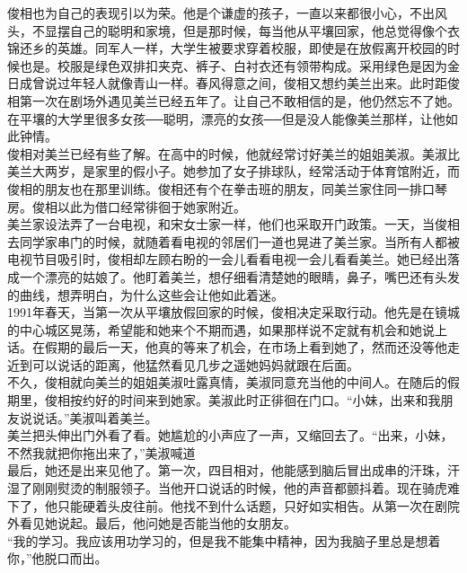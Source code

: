 俊相也为自己的表现引以为荣。他是个谦虚的孩子，一直以来都很小心，不出风头，不显摆自己的聪明和家境，但是那时候，每当他从平壤回家，他总觉得像个衣锦还乡的英雄。同军人一样，大学生被要求穿着校服，即使是在放假离开校园的时候也是。校服是绿色双排扣夹克、裤子、白衬衣还有领带构成。采用绿色是因为金日成曾说过年轻人就像青山一样。春风得意之间，俊相又想约美兰出来。此时距俊相第一次在剧场外遇见美兰已经五年了。让自己不敢相信的是，他仍然忘不了她。在平壤的大学里很多女孩──聪明，漂亮的女孩──但是没人能像美兰那样，让他如此钟情。\\

俊相对美兰已经有些了解。在高中的时候，他就经常讨好美兰的姐姐美淑。美淑比美兰大两岁，是家里的假小子。她参加了女子排球队，经常活动于体育馆附近，而俊相的朋友也在那里训练。俊相还有个在拳击班的朋友，同美兰家住同一排口琴房。俊相以此为借口经常徘徊于她家附近。\\

美兰家设法弄了一台电视，和宋女士家一样，他们也采取开门政策。一天，当俊相去同学家串门的时候，就随着看电视的邻居们一道也晃进了美兰家。当所有人都被电视节目吸引时，俊相却左顾右盼的一会儿看看电视一会儿看看美兰。她已经出落成一个漂亮的姑娘了。他盯着美兰，想仔细看清楚她的眼睛，鼻子，嘴巴还有头发的曲线，想弄明白，为什么这些会让他如此着迷。\\

1991年春天，当第一次从平壤放假回家的时候，俊相决定采取行动。他先是在镜城的中心城区晃荡，希望能和她来个不期而遇，如果那样说不定就有机会和她说上话。在假期的最后一天，他真的等来了机会，在市场上看到她了，然而还没等他走近到可以说话的距离，他猛然看见几步之遥她妈妈就跟在后面。\\

不久，俊相就向美兰的姐姐美淑吐露真情，美淑同意充当他的中间人。在随后的假期里，俊相按约好的时间来到她家。美淑此时正徘徊在门口。“小妹，出来和我朋友说说话。”美淑叫着美兰。\\

美兰把头伸出门外看了看。她尴尬的小声应了一声，又缩回去了。“出来，小妹，不然我就把你拖出来了，”美淑喊道\\

最后，她还是出来见他了。第一次，四目相对，他能感到脑后冒出成串的汗珠，汗湿了刚刚熨烫的制服领子。当他开口说话的时候，他的声音都颤抖着。现在骑虎难下了，他只能硬着头皮往前。他找不到什么话题，只好如实相告。从第一次在剧院外看见她说起。最后，他问她是否能当他的女朋友。\\

“我的学习。我应该用功学习的，但是我不能集中精神，因为我脑子里总是想着你，”他脱口而出。\\

